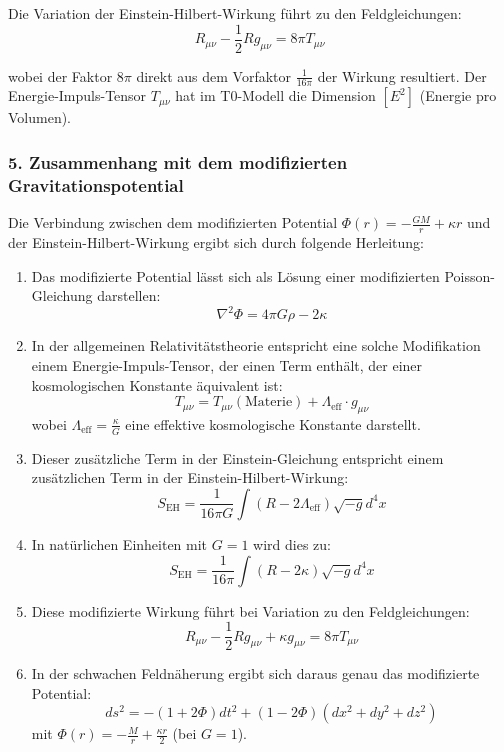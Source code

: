 \documentclass[12pt,a4paper]{article}
\begin{document}
	Die Variation der Einstein-Hilbert-Wirkung führt zu den Feldgleichungen:
	\[
	R_{\mu\nu} - \frac{1}{2}Rg_{\mu\nu} = 8\pi T_{\mu\nu}
	\]
	
	wobei der Faktor $8\pi$ direkt aus dem Vorfaktor $\frac{1}{16\pi}$ der Wirkung resultiert. Der Energie-Impuls-Tensor $T_{\mu\nu}$ hat im T0-Modell die Dimension $[E^2]$ (Energie pro Volumen).
	
	\subsubsection*{5. Zusammenhang mit dem modifizierten Gravitationspotential}
	
	Die Verbindung zwischen dem modifizierten Potential $\Phi(r) = -\frac{GM}{r} + \kappa r$ und der Einstein-Hilbert-Wirkung ergibt sich durch folgende Herleitung:
	
	\begin{enumerate}
		\item Das modifizierte Potential lässt sich als Lösung einer modifizierten Poisson-Gleichung darstellen:
		\[
		\nabla^2\Phi = 4\pi G\rho - 2\kappa
		\]
		
		\item In der allgemeinen Relativitätstheorie entspricht eine solche Modifikation einem Energie-Impuls-Tensor, der einen Term enthält, der einer kosmologischen Konstante äquivalent ist:
		\[
		T_{\mu\nu} = T_{\mu\nu}(\text{Materie}) + \Lambda_{\text{eff}} \cdot g_{\mu\nu}
		\]
		wobei $\Lambda_{\text{eff}} = \frac{\kappa}{G}$ eine effektive kosmologische Konstante darstellt.
		
		\item Dieser zusätzliche Term in der Einstein-Gleichung entspricht einem zusätzlichen Term in der Einstein-Hilbert-Wirkung:
		\[
		S_{\mathrm{EH}} = \frac{1}{16\pi G}\int(R - 2\Lambda_{\text{eff}})\sqrt{-g}d^4x
		\]
		
		\item In natürlichen Einheiten mit $G = 1$ wird dies zu:
		\[
		S_{\mathrm{EH}} = \frac{1}{16\pi}\int(R - 2\kappa)\sqrt{-g}d^4x
		\]
		
		\item Diese modifizierte Wirkung führt bei Variation zu den Feldgleichungen:
		\[
		R_{\mu\nu} - \frac{1}{2}Rg_{\mu\nu} + \kappa g_{\mu\nu} = 8\pi T_{\mu\nu}
		\]
		
		\item In der schwachen Feldnäherung ergibt sich daraus genau das modifizierte Potential:
		\[
		ds^2 = -(1+2\Phi)dt^2 + (1-2\Phi)(dx^2 + dy^2 + dz^2)
		\]
		mit $\Phi(r) = -\frac{M}{r} + \frac{\kappa r}{2}$ (bei $G = 1$).
	\end{enumerate}
	
\end{document}
